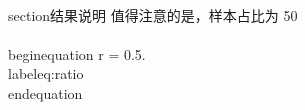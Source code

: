 \\section{结果说明}
值得注意的是，样本占比为 50\\%
\\begin{equation}
  r = 0.5.
  \\label{eq:ratio}
\\end{equation}
